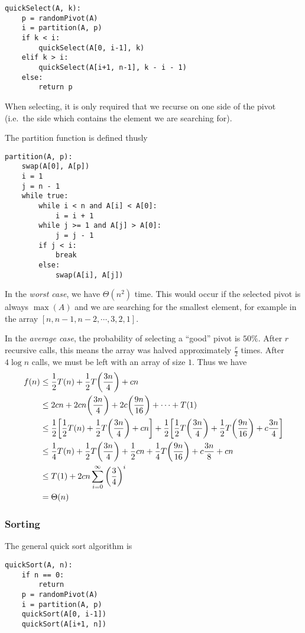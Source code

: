 \documentclass[12pt]{article}
\begin{document}
\begin{verbatim}
quickSelect(A, k):
    p = randomPivot(A)
    i = partition(A, p)
    if k < i:
        quickSelect(A[0, i-1], k)
    elif k > i:
        quickSelect(A[i+1, n-1], k - i - 1)
    else:
        return p
\end{verbatim}

When selecting, it is only required that we recurse on one side of the pivot (i.e.\ the side which contains the element we are searching for).

The partition function is defined thusly
\begin{verbatim}
partition(A, p):
    swap(A[0], A[p])
    i = 1
    j = n - 1
    while true:
        while i < n and A[i] < A[0]:
            i = i + 1
        while j >= 1 and A[j] > A[0]:
            j = j - 1
        if j < i:
            break
        else:
            swap(A[i], A[j])
\end{verbatim}

In the \emph{worst case}, we have $\Theta(n^2)$ time. This would occur if the selected pivot is always $\max(A)$ and we are searching for the smallest element, for example in the array $[n, n-1, n-2, \cdots, 3, 2, 1]$.

In the \emph{average case}, the probability of selecting a ``good'' pivot is $50\%$. After $r$ recursive calls, this means the array was halved approximately $\frac{r}{2}$ times. After $4\log n$ calls, we must be left with an array of size $1$. Thus we have
\begin{align*}
f(n) &\leq \frac{1}{2} T(n) + \frac{1}{2} T\bigg(\frac{3n}{4}\bigg) + cn\\
&\leq 2cn + 2cn\bigg(\frac{3n}{4}\bigg) + 2c\bigg(\frac{9n}{16}\bigg) + \cdots + T(1)\\
&\leq \frac{1}{2} \bigg[\frac{1}{2} T(n) + \frac{1}{2} T\bigg(\frac{3n}{4}\bigg) + cn\bigg] + \frac{1}{2} \bigg[\frac{1}{2} T\bigg(\frac{3n}{4}\bigg) + \frac{1}{2} T\bigg(\frac{9n}{16}\bigg) + c \frac{3n}{4}\bigg]\\
&\leq \frac{1}{4} T(n) + \frac{1}{2} T\bigg(\frac{3n}{4}\bigg) + \frac{1}{2} cn + \frac{1}{4} T\bigg(\frac{9n}{16}\bigg) + c\frac{3n}{8}+ cn\\
&\leq T(1) + 2cn\displaystyle\sum_{i=0}^\infty {\bigg(\frac{3}{4}\bigg)}^i\\
&= \Theta(n)
\end{align*}

\subsubsection{Sorting}
The general quick sort algorithm is
\begin{verbatim}
quickSort(A, n):
    if n == 0:
        return
    p = randomPivot(A)
    i = partition(A, p)
    quickSort(A[0, i-1])
    quickSort(A[i+1, n])
\end{verbatim}
\end{document}
